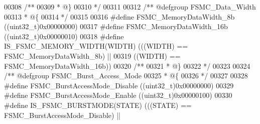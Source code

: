 \begin{DoxyCode}
00308 \textcolor{comment}{/**}
00309 \textcolor{comment}{  * @\}}
00310 \textcolor{comment}{  */}
00311 
00312 \textcolor{comment}{/** @defgroup FSMC\_Data\_Width }
00313 \textcolor{comment}{  * @\{}
00314 \textcolor{comment}{  */}
00315 
00316 \textcolor{preprocessor}{#}\textcolor{preprocessor}{define} \textcolor{preprocessor}{FSMC\_MemoryDataWidth\_8b}                  \textcolor{preprocessor}{(}\textcolor{preprocessor}{(}\textcolor{preprocessor}{uint32\_t}\textcolor{preprocessor}{)}0x00000000\textcolor{preprocessor}{)}
00317 \textcolor{preprocessor}{#}\textcolor{preprocessor}{define} \textcolor{preprocessor}{FSMC\_MemoryDataWidth\_16b}                 \textcolor{preprocessor}{(}\textcolor{preprocessor}{(}\textcolor{preprocessor}{uint32\_t}\textcolor{preprocessor}{)}0x00000010\textcolor{preprocessor}{)}
00318 \textcolor{preprocessor}{#}\textcolor{preprocessor}{define} \textcolor{preprocessor}{IS\_FSMC\_MEMORY\_WIDTH}\textcolor{preprocessor}{(}\textcolor{preprocessor}{WIDTH}\textcolor{preprocessor}{)} \textcolor{preprocessor}{(}\textcolor{preprocessor}{(}\textcolor{preprocessor}{(}\textcolor{preprocessor}{WIDTH}\textcolor{preprocessor}{)} \textcolor{preprocessor}{==} FSMC_MemoryDataWidth_8b\textcolor{preprocessor}{)} \textcolor{preprocessor}{||}
00319                                      \textcolor{preprocessor}{(}\textcolor{preprocessor}{(}\textcolor{preprocessor}{WIDTH}\textcolor{preprocessor}{)} \textcolor{preprocessor}{==} FSMC_MemoryDataWidth_16b\textcolor{preprocessor}{)}\textcolor{preprocessor}{)}
00320 \textcolor{comment}{/**}
00321 \textcolor{comment}{  * @\}}
00322 \textcolor{comment}{  */}
00323 
00324 \textcolor{comment}{/** @defgroup FSMC\_Burst\_Access\_Mode }
00325 \textcolor{comment}{  * @\{}
00326 \textcolor{comment}{  */}
00327 
00328 \textcolor{preprocessor}{#}\textcolor{preprocessor}{define} \textcolor{preprocessor}{FSMC\_BurstAccessMode\_Disable}             \textcolor{preprocessor}{(}\textcolor{preprocessor}{(}\textcolor{preprocessor}{uint32\_t}\textcolor{preprocessor}{)}0x00000000\textcolor{preprocessor}{)}
00329 \textcolor{preprocessor}{#}\textcolor{preprocessor}{define} \textcolor{preprocessor}{FSMC\_BurstAccessMode\_Enable}              \textcolor{preprocessor}{(}\textcolor{preprocessor}{(}\textcolor{preprocessor}{uint32\_t}\textcolor{preprocessor}{)}0x00000100\textcolor{preprocessor}{)}
00330 \textcolor{preprocessor}{#}\textcolor{preprocessor}{define} \textcolor{preprocessor}{IS\_FSMC\_BURSTMODE}\textcolor{preprocessor}{(}\textcolor{preprocessor}{STATE}\textcolor{preprocessor}{)} \textcolor{preprocessor}{(}\textcolor{preprocessor}{(}\textcolor{preprocessor}{(}\textcolor{preprocessor}{STATE}\textcolor{preprocessor}{)} \textcolor{preprocessor}{==} FSMC_BurstAccessMode_Disable\textcolor{preprocessor}{)} \textcolor{preprocessor}{||}

\end{DoxyCode}
